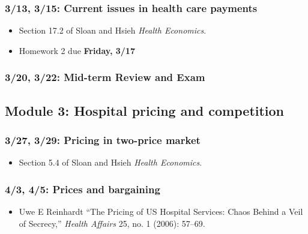 \documentclass[11pt,]{article}
\providecommand{\tightlist}{%
  \setlength{\itemsep}{0pt}\setlength{\parskip}{0pt}}
\begin{document}
\hypertarget{current-issues-in-health-care-payments}{%
\subsubsection{3/13, 3/15: Current issues in health care
payments}\label{current-issues-in-health-care-payments}}

\begin{itemize}
\tightlist
\item
  Section 17.2 of Sloan and Hsieh \emph{Health Economics}.
\item
  Homework 2 due \textbf{Friday, 3/17}
\end{itemize}

\hypertarget{mid-term-review-and-exam}{%
\subsubsection{3/20, 3/22: Mid-term Review and
Exam}\label{mid-term-review-and-exam}}

\hypertarget{module-3-hospital-pricing-and-competition}{%
\subsection{Module 3: Hospital pricing and
competition}\label{module-3-hospital-pricing-and-competition}}

\hypertarget{pricing-in-two-price-market}{%
\subsubsection{3/27, 3/29: Pricing in two-price
market}\label{pricing-in-two-price-market}}

\begin{itemize}
\tightlist
\item
  Section 5.4 of Sloan and Hsieh \emph{Health Economics}.
\end{itemize}

\hypertarget{prices-and-bargaining}{%
\subsubsection{4/3, 4/5: Prices and
bargaining}\label{prices-and-bargaining}}

\begin{itemize}
\tightlist
\item
  Uwe E Reinhardt {``The Pricing of {US} Hospital Services: Chaos Behind
  a Veil of Secrecy,''} \emph{Health Affairs} 25, no. 1 (2006): 57--69.
\end{itemize}
\end{document}
